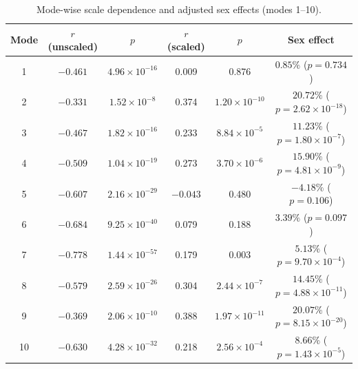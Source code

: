 \documentclass[openacc]{rsproca_new}
\begin{document}
\begin{table}[p]
\centering
\caption{Mode-wise scale dependence and adjusted sex effects (modes 1--10).}
\label{tab:modes}
\begin{tabular}{cccccc}
\toprule
Mode & $r$ (unscaled) & $p$ & $r$ (scaled) & $p$ & Sex effect \\
\midrule
1 & $-0.461$ & $4.96 \times 10^{-16}$ & 0.009 & 0.876 & $0.85\%$ ($p = 0.734$) \\
2 & $-0.331$ & $1.52 \times 10^{-8}$ & 0.374 & $1.20 \times 10^{-10}$ & $20.72\%$ ($p = 2.62 \times 10^{-18}$) \\
3 & $-0.467$ & $1.82 \times 10^{-16}$ & 0.233 & $8.84 \times 10^{-5}$ & $11.23\%$ ($p = 1.80 \times 10^{-7}$) \\
4 & $-0.509$ & $1.04 \times 10^{-19}$ & 0.273 & $3.70 \times 10^{-6}$ & $15.90\%$ ($p = 4.81 \times 10^{-9}$) \\
5 & $-0.607$ & $2.16 \times 10^{-29}$ & $-0.043$ & 0.480 & $-4.18\%$ ($p = 0.106$) \\
6 & $-0.684$ & $9.25 \times 10^{-40}$ & 0.079 & 0.188 & $3.39\%$ ($p = 0.097$) \\
7 & $-0.778$ & $1.44 \times 10^{-57}$ & 0.179 & 0.003 & $5.13\%$ ($p = 9.70 \times 10^{-4}$) \\
8 & $-0.579$ & $2.59 \times 10^{-26}$ & 0.304 & $2.44 \times 10^{-7}$ & $14.45\%$ ($p = 4.88 \times 10^{-11}$) \\
9 & $-0.369$ & $2.06 \times 10^{-10}$ & 0.388 & $1.97 \times 10^{-11}$ & $20.07\%$ ($p = 8.15 \times 10^{-20}$) \\
10 & $-0.630$ & $4.28 \times 10^{-32}$ & 0.218 & $2.56 \times 10^{-4}$ & $8.66\%$ ($p = 1.43 \times 10^{-5}$) \\
\bottomrule
\end{tabular}
\end{table}
\end{document}
